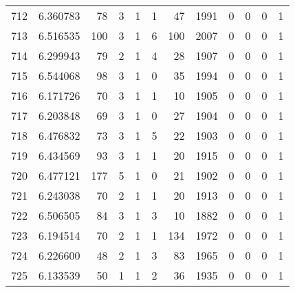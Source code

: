 \begin{tabular}{lrrrrrrrrrrr}
712 &  6.360783 &   78 &      3 &        1 &      1 &              47 &  1991 &               0 &               0 &               0 &               1 \\
713 &  6.516535 &  100 &      3 &        1 &      6 &             100 &  2007 &               0 &               0 &               0 &               1 \\
714 &  6.299943 &   79 &      2 &        1 &      4 &              28 &  1907 &               0 &               0 &               0 &               1 \\
715 &  6.544068 &   98 &      3 &        1 &      0 &              35 &  1994 &               0 &               0 &               0 &               1 \\
716 &  6.171726 &   70 &      3 &        1 &      1 &              10 &  1905 &               0 &               0 &               0 &               1 \\
717 &  6.203848 &   69 &      3 &        1 &      0 &              27 &  1904 &               0 &               0 &               0 &               1 \\
718 &  6.476832 &   73 &      3 &        1 &      5 &              22 &  1903 &               0 &               0 &               0 &               1 \\
719 &  6.434569 &   93 &      3 &        1 &      1 &              20 &  1915 &               0 &               0 &               0 &               1 \\
720 &  6.477121 &  177 &      5 &        1 &      0 &              21 &  1902 &               0 &               0 &               0 &               1 \\
721 &  6.243038 &   70 &      2 &        1 &      1 &              20 &  1913 &               0 &               0 &               0 &               1 \\
722 &  6.506505 &   84 &      3 &        1 &      3 &              10 &  1882 &               0 &               0 &               0 &               1 \\
723 &  6.194514 &   70 &      2 &        1 &      1 &             134 &  1972 &               0 &               0 &               0 &               1 \\
724 &  6.226600 &   48 &      2 &        1 &      3 &              83 &  1965 &               0 &               0 &               0 &               1 \\
725 &  6.133539 &   50 &      1 &        1 &      2 &              36 &  1935 &               0 &               0 &               0 &               1 \\

\end{tabular}
